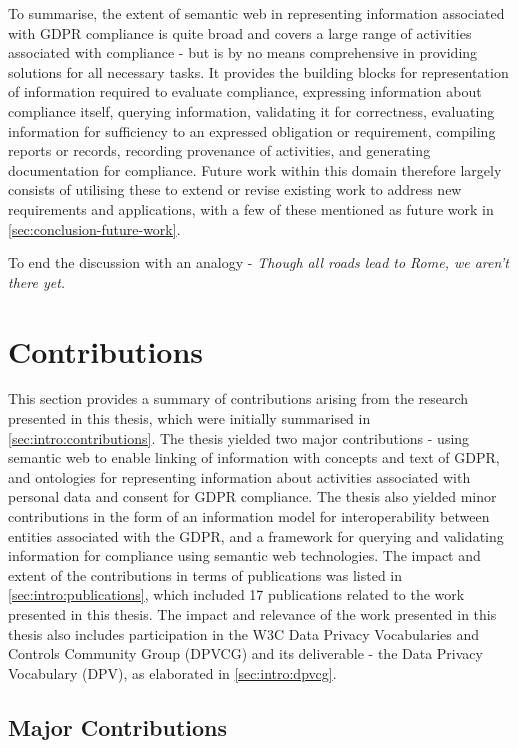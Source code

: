 To summarise, the extent of semantic web in representing information associated with GDPR compliance is quite broad and covers a large range of activities associated with compliance - but is by no means comprehensive in providing solutions for all necessary tasks.
It provides the building blocks for representation of information required to evaluate compliance, expressing information about compliance itself, querying information, validating it for correctness, evaluating information for sufficiency to an expressed obligation or requirement, compiling reports or records, recording provenance of activities, and generating documentation for compliance.
Future work within this domain therefore largely consists of utilising these to extend or revise existing work to address new requirements and applications, with a few of these mentioned as future work in \autoref{sec:conclusion-future-work}.

To end the discussion with an analogy - \textit{Though all roads lead to Rome, we aren't there yet.}

\section{Contributions}\label{sec:conclusion-contributions}
This section provides a summary of contributions arising from the research presented in this thesis, which were initially summarised in \autoref{sec:intro:contributions}.
The thesis yielded two major contributions - using semantic web to enable linking of information with concepts and text of GDPR, and ontologies for representing information about activities associated with personal data and consent for GDPR compliance. The thesis also yielded minor contributions in the form of an information model for interoperability between entities associated with the GDPR, and a framework for querying and validating information for compliance using semantic web technologies.
The impact and extent of the contributions in terms of publications was listed in \autoref{sec:intro:publications}, which included 17 publications related to the work presented in this thesis.
The impact and relevance of the work presented in this thesis also includes participation in the W3C Data Privacy Vocabularies and Controls Community Group (DPVCG) and its deliverable - the Data Privacy Vocabulary (DPV), as elaborated in \autoref{sec:intro:dpvcg}.

\subsection*{Major Contributions}
